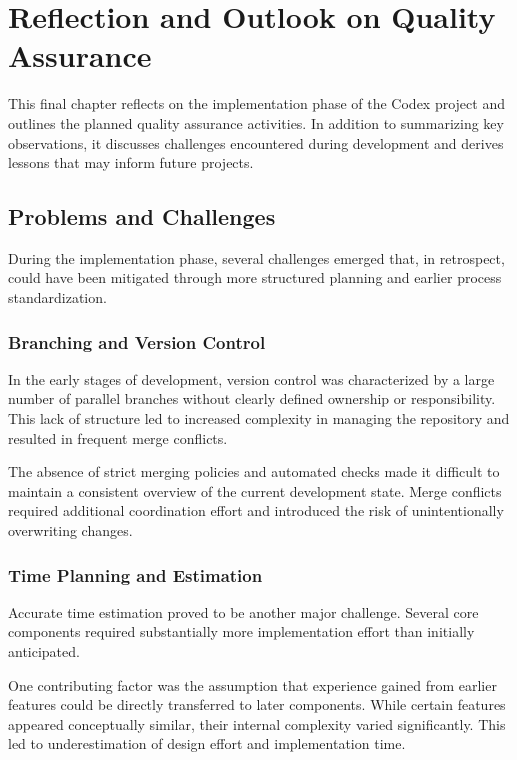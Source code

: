 
\chapter{Reflection and Outlook on Quality Assurance}

This final chapter reflects on the implementation phase of the Codex project and outlines the planned quality assurance activities. In addition to summarizing key observations, it discusses challenges encountered during development and derives lessons that may inform future projects.

\section{Problems and Challenges}

During the implementation phase, several challenges emerged that, in retrospect, could have been mitigated through more structured planning and earlier process standardization.

\subsection{Branching and Version Control}

In the early stages of development, version control was characterized by a large number of parallel branches without clearly defined ownership or responsibility. This lack of structure led to increased complexity in managing the repository and resulted in frequent merge conflicts.

The absence of strict merging policies and automated checks made it difficult to maintain a consistent overview of the current development state. Merge conflicts required additional coordination effort and introduced the risk of unintentionally overwriting changes.

\subsection{Time Planning and Estimation}

Accurate time estimation proved to be another major challenge. Several core components required substantially more implementation effort than initially anticipated.

One contributing factor was the assumption that experience gained from earlier features could be directly transferred to later components. While certain features appeared conceptually similar, their internal complexity varied significantly. This led to underestimation of design effort and implementation time.

